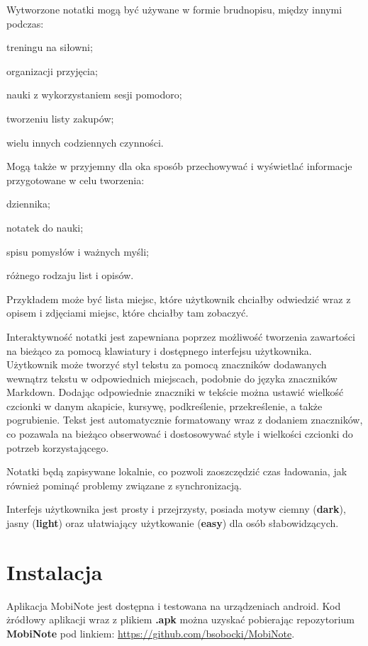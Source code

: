 \documentclass[shortabstract]{iithesis}
\begin{document}
Wytworzone notatki mogą być używane w formie brudnopisu, między innymi podczas:
\begin{compactitem}
    \item treningu na siłowni;
    \item organizacji przyjęcia;
    \item nauki z wykorzystaniem sesji pomodoro;
    \item tworzeniu listy zakupów;
    \item wielu innych codziennych czynności.
\end{compactitem}

Mogą także w przyjemny dla oka sposób przechowywać i wyświetlać informacje przygotowane w celu tworzenia:
\begin{compactitem}
 \item dziennika;
 \item notatek do nauki;
 \item spisu pomysłów i ważnych myśli;
 \item różnego rodzaju list i opisów.
\end{compactitem}
 Przykładem może być lista miejsc, które użytkownik chciałby odwiedzić wraz z opisem i zdjęciami miejsc, które chciałby tam zobaczyć.

Interaktywność notatki jest zapewniana poprzez możliwość tworzenia zawartości na bieżąco za pomocą klawiatury i dostępnego interfejsu użytkownika.
Użytkownik może tworzyć styl tekstu za pomocą znaczników dodawanych wewnątrz tekstu w odpowiednich miejscach, podobnie do języka znaczników Markdown.
Dodając odpowiednie znaczniki w tekście można ustawić wielkość czcionki w danym akapicie, kursywę, podkreślenie, przekreślenie, a także pogrubienie.
Tekst jest automatycznie formatowany wraz z dodaniem znaczników, co pozawala na bieżąco obserwować i dostosowywać style i wielkości czcionki do potrzeb korzystającego.

Notatki będą zapisywane lokalnie, co pozwoli zaoszczędzić czas ładowania, jak również pominąć problemy związane z synchronizacją.

Interfejs użytkownika jest prosty i przejrzysty, posiada motyw ciemny (\textbf{dark}), jasny (\textbf{light}) oraz ułatwiający użytkowanie (\textbf{easy}) dla osób słabowidzących.

\chapter{Instalacja}

Aplikacja MobiNote jest dostępna i testowana na urządzeniach android.
Kod żródłowy aplikacji wraz z plikiem \textbf{.apk} można uzyskać pobierając repozytorium \textbf{MobiNote} pod linkiem:
\url{https://github.com/bsobocki/MobiNote}.
\end{document}
